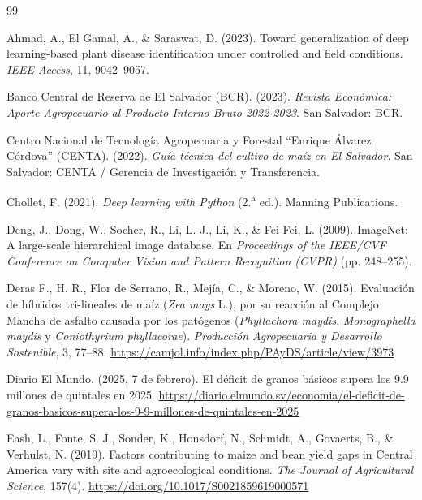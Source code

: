 \newpage
\begin{singlespace}
\begin{thebibliography}{99}

Ahmad, A., El Gamal, A., \& Saraswat, D. (2023). Toward generalization of deep learning-based plant disease identification under controlled and field conditions. \textit{IEEE Access}, 11, 9042--9057.

Banco Central de Reserva de El Salvador (BCR). (2023). \textit{Revista Econ\'omica: Aporte Agropecuario al Producto Interno Bruto 2022-2023}. San Salvador: BCR.

Centro Nacional de Tecnolog\'ia Agropecuaria y Forestal ``Enrique \'Alvarez C\'ordova'' (CENTA). (2022). \textit{Gu\'ia t\'ecnica del cultivo de ma\'iz en El Salvador}. San Salvador: CENTA / Gerencia de Investigaci\'on y Transferencia.

Chollet, F. (2021). \textit{Deep learning with Python} (2.\textsuperscript{a} ed.). Manning Publications.

Deng, J., Dong, W., Socher, R., Li, L.-J., Li, K., \& Fei-Fei, L. (2009). ImageNet: A large-scale hierarchical image database. En \textit{Proceedings of the IEEE/CVF Conference on Computer Vision and Pattern Recognition (CVPR)} (pp. 248--255).

Deras F., H. R., Flor de Serrano, R., Mej\'ia, C., \& Moreno, W. (2015). Evaluaci\'on de h\'ibridos tri-lineales de ma\'iz (\textit{Zea mays} L.), por su reacci\'on al Complejo Mancha de asfalto causada por los pat\'ogenos (\textit{Phyllachora maydis}, \textit{Monographella maydis} y \textit{Coniothyrium phyllacorae}). \textit{Producci\'on Agropecuaria y Desarrollo Sostenible}, 3, 77--88. \url{https://camjol.info/index.php/PAyDS/article/view/3973}

Diario El Mundo. (2025, 7 de febrero). El d\'eficit de granos b\'asicos supera los 9.9 millones de quintales en 2025. \url{https://diario.elmundo.sv/economia/el-deficit-de-granos-basicos-supera-los-9-9-millones-de-quintales-en-2025}

Eash, L., Fonte, S. J., Sonder, K., Honsdorf, N., Schmidt, A., Govaerts, B., \& Verhulst, N. (2019). Factors contributing to maize and bean yield gaps in Central America vary with site and agroecological conditions. \textit{The Journal of Agricultural Science}, 157(4). \url{https://doi.org/10.1017/S0021859619000571}


\end{thebibliography}
\end{singlespace}
